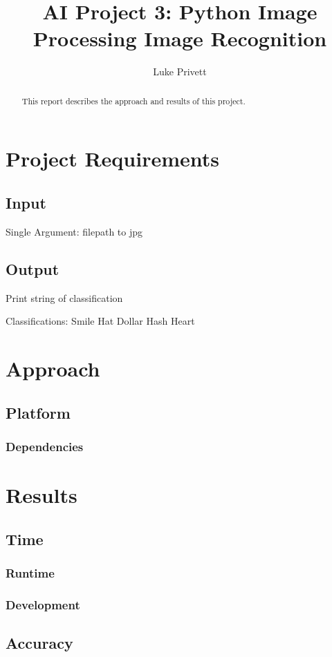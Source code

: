 \documentclass[]{report}
\title{AI Project 3: Python Image Processing Image Recognition}
\author{Luke Privett}
\begin{document}
\maketitle

\begin{abstract}
	This report describes the approach and results of this project.
	
\end{abstract}

\tableofcontents

	\section{Project Requirements}
		\subsection{Input}
			Single Argument: filepath to jpg
		\subsection{Output}
			Print string of classification
			
			Classifications:
			Smile
			Hat
			Dollar
			Hash
			Heart

	\section{Approach}


		\subsection{Platform}

		\subsubsection{Dependencies}



	\section{Results}
		\subsection{Time}

			\subsubsection{Runtime}

			\subsubsection{Development}

		\subsection{Accuracy}


\end{document}
